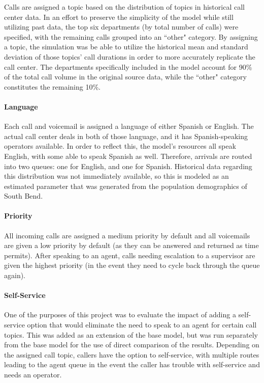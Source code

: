 \documentclass[12pt]{article}
\begin{document}
Calls are assigned a topic based on the distribution of topics in historical call center data.  In an effort to preserve the simplicity of the model while still utilizing past data, the top six departments (by total number of calls) were specified, with the remaining calls grouped into an ``other" category.  By assigning a topic, the simulation was be able to utilize the historical mean and standard deviation of those topics' call durations in order to more accurately replicate the call center.  The departments specifically included in the model account for 90\% of the total call volume in the original source data, while the ``other" category constitutes the remaining 10\%.

	\paragraph{Language}

Each call and voicemail is assigned a language of either Spanish or English.  The actual call center deals in both of those language, and it has Spanish-speaking operators available.  In order to reflect this, the model's resources all speak English, with some able to speak Spanish as well.  Therefore, arrivals are routed into two queues:  one for English, and one for Spanish.  Historical data regarding this distribution was not immediately available, so this is modeled as an estimated parameter that was generated from the population demographics of South Bend.

	\paragraph{Priority}

All incoming calls are assigned a medium priority by default and all voicemails are given a low priority by default (as they can be answered and returned as time permits).  After speaking to an agent, calls needing escalation to a supervisor are given the highest priority (in the event they need to cycle back through the queue again).

	\paragraph{Self-Service}

One of the purposes of this project was to evaluate the impact of adding a self-service option that would eliminate the need to speak to an agent for certain call topics.  This was added as an extension of the base model, but was run separately from the base model for the use of direct comparison of the results.  Depending on the assigned call topic, callers have the option to self-service, with multiple routes leading to the agent queue in the event the caller has trouble with self-service and needs an operator.
\end{document}
